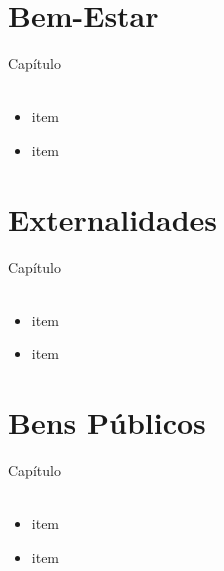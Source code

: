 \documentclass{beamer}[10]
\begin{document}
\begin{frame}
	\frametitle{}

	

\end{frame}

\section[Bem-Estar]{Bem-Estar}
\begin{frame}
	\huge Capítulo \normalsize
	\\~\\
	\begin{itemize}
		\item item
		\item item
	\end{itemize}
\end{frame}


\begin{frame}
	\frametitle{}

	

\end{frame}

\section[Externalidades]{Externalidades}
\begin{frame}
	\huge Capítulo \normalsize
	\\~\\
	\begin{itemize}
		\item item
		\item item
	\end{itemize}
\end{frame}


\begin{frame}
	\frametitle{}

	

\end{frame}

\section[B.Públicos]{Bens Públicos}
\begin{frame}
	\huge Capítulo \normalsize
	\\~\\
	\begin{itemize}
		\item item
		\item item
	\end{itemize}
\end{frame}
\end{document}
